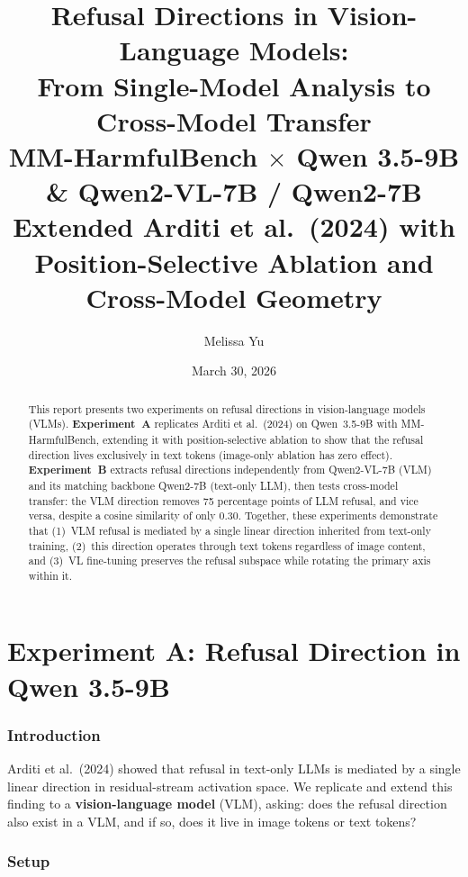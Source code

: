 \documentclass[11pt,a4paper]{article}
\title{\textbf{Refusal Directions in Vision-Language Models:\\From Single-Model Analysis to Cross-Model Transfer}\\[4pt]
\large MM-HarmfulBench $\times$ Qwen 3.5-9B \& Qwen2-VL-7B / Qwen2-7B\\[2pt]
\normalsize Extended Arditi et al.\ (2024) with Position-Selective Ablation and Cross-Model Geometry}
\author{Melissa Yu}
\date{March 30, 2026}
\begin{document}
\maketitle

\begin{abstract}
This report presents two experiments on refusal directions in vision-language models (VLMs). \textbf{Experiment~A} replicates Arditi et al.\ (2024) on Qwen~3.5-9B with MM-HarmfulBench, extending it with position-selective ablation to show that the refusal direction lives exclusively in text tokens (image-only ablation has zero effect). \textbf{Experiment~B} extracts refusal directions independently from Qwen2-VL-7B (VLM) and its matching backbone Qwen2-7B (text-only LLM), then tests cross-model transfer: the VLM direction removes 75 percentage points of LLM refusal, and vice versa, despite a cosine similarity of only 0.30. Together, these experiments demonstrate that (1)~VLM refusal is mediated by a single linear direction inherited from text-only training, (2)~this direction operates through text tokens regardless of image content, and (3)~VL fine-tuning preserves the refusal subspace while rotating the primary axis within it.
\end{abstract}

\part{Experiment A: Refusal Direction in Qwen 3.5-9B}
\label{part:expA}

\section{Introduction}

Arditi et al.\ (2024) showed that refusal in text-only LLMs is mediated by a single linear direction in residual-stream activation space. We replicate and extend this finding to a \textbf{vision-language model} (VLM), asking: does the refusal direction also exist in a VLM, and if so, does it live in image tokens or text tokens?

\section{Setup}
\end{document}
